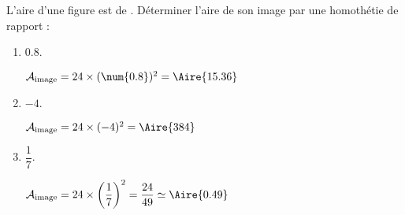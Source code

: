     L'aire d'une figure est de . Déterminer l'aire de son image par une homothétie de rapport :
    \begin{enumerate}
        \item $\num{0.8}$.

        {\color{red} $\mathcal{A}_{\text{image}}=24 \times (\num{0.8})^2=\Aire{15.36}$}
        \item $-4$.

        {\color{red} $\mathcal{A}_{\text{image}}=24 \times (-4)^2=\Aire{384}$}
        \item $\dfrac{1}{7}$.

        {\color{red} $\mathcal{A}_{\text{image}}=24 \times \left( \dfrac{1}{7} \right)^2=\dfrac{24}{49} \simeq \Aire{0.49}$}
    \end{enumerate}
